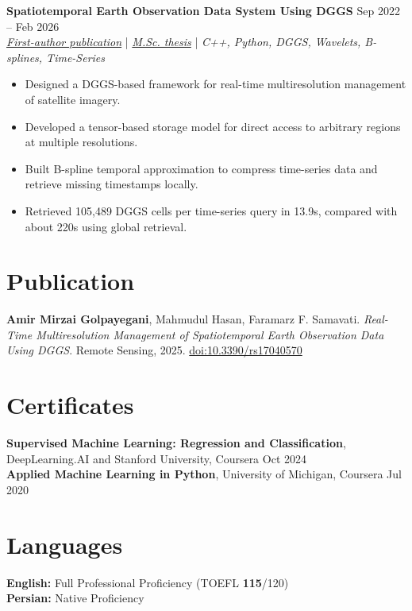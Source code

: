 \documentclass[a4paper,10pt]{article}
\begin{document}
\noindent
\textbf{Spatiotemporal Earth Observation Data System Using DGGS} \hfill Sep 2022 -- Feb 2026 \\
\textit{\href{https://doi.org/10.3390/rs17040570}{First-author publication}} | \textit{\href{https://ucalgary.scholaris.ca/items/114b394b-e516-4732-bd3a-45dd6160d480}{M.Sc. thesis}} | \textit{C++, Python, DGGS, Wavelets, B-splines, Time-Series}
\begin{itemize}[leftmargin=0.25in]
    \item Designed a DGGS-based framework for real-time multiresolution management of satellite imagery.
    \item Developed a tensor-based storage model for direct access to arbitrary regions at multiple resolutions.
    \item Built B-spline temporal approximation to compress time-series data and retrieve missing timestamps locally.
    \item Retrieved 105,489 DGGS cells per time-series query in 13.9s, compared with about 220s using global retrieval.
\end{itemize}

\section*{Publication}

\textbf{Amir Mirzai Golpayegani}, Mahmudul Hasan, Faramarz F. Samavati.
\textit{Real-Time Multiresolution Management of Spatiotemporal Earth Observation Data Using DGGS}.
Remote Sensing, 2025. \href{https://doi.org/10.3390/rs17040570}{doi:10.3390/rs17040570}

\section*{Certificates}

\textbf{Supervised Machine Learning: Regression and Classification}, DeepLearning.AI and Stanford University, Coursera \hfill Oct 2024 \\
\textbf{Applied Machine Learning in Python}, University of Michigan, Coursera \hfill Jul 2020

\section*{Languages}

\textbf{English:} Full Professional Proficiency (TOEFL \textbf{115}/120) \\
\textbf{Persian:} Native Proficiency
\end{document}
